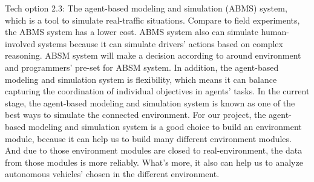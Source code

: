 \documentclass[draftclsnofoot,onecolumn]{IEEEtran}
\begin{document}
\newline
Tech option 2.3: The agent-based modeling and simulation (ABMS) system, which is a tool to simulate real-traffic situations. Compare to field experiments, the ABMS system has a lower cost.
ABMS system also can simulate human-involved systems because it can simulate drivers’ actions based on complex reasoning. ABSM system will make a decision according to around environment and programmers’ pre-set for ABSM system. In addition, the agent-based modeling and simulation system is flexibility, which means it can balance capturing the coordination of individual objectives in agents’ tasks. In the current stage, the agent-based modeling and simulation system is known as one of the best ways to simulate the connected environment.
For our project, the agent-based modeling and simulation system is a good choice to build an environment module, because it can help us to build many different environment modules. And due to those environment modules are closed to real-environment, the data from those modules is more reliably. What’s more, it also can help us to analyze autonomous vehicles’ chosen in the different environment.
\end{document}
